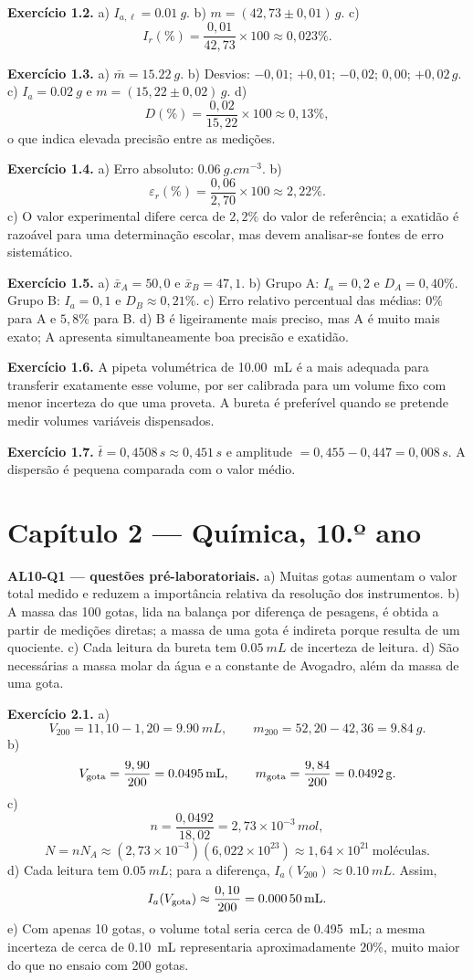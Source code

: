 \documentclass[11pt,a4paper,openany]{book}
\begin{document}
\medskip
\textbf{Exercício 1.2.} a) $I_{a,\ell}=\SI{0.01}{g}$. b) $m=(42,73\pm0,01)\,\si{g}$. c)
\[
I_r(\%)=\frac{0,01}{42,73}\times100\approx0,023\%.
\]

\medskip
\textbf{Exercício 1.3.} a) $\bar m=\SI{15.22}{g}$. b) Desvios: $-0,01$; $+0,01$; $-0,02$; $0,00$; $+0,02\,\si{g}$. c) $I_a=\SI{0.02}{g}$ e $m=(15,22\pm0,02)\,\si{g}$. d)
\[
D(\%)=\frac{0,02}{15,22}\times100\approx0,13\%,
\]
o que indica elevada precisão entre as medições.

\medskip
\textbf{Exercício 1.4.} a) Erro absoluto: $\SI{0.06}{g.cm^{-3}}$. b)
\[
\varepsilon_r(\%)=\frac{0,06}{2,70}\times100\approx2,22\%.
\]
c) O valor experimental difere cerca de $2,2\%$ do valor de referência; a exatidão é razoável para uma determinação escolar, mas devem analisar-se fontes de erro sistemático.

\medskip
\textbf{Exercício 1.5.} a) $\bar x_A=50,0$ e $\bar x_B=47,1$. b) Grupo A: $I_a=0,2$ e $D_A=0,40\%$. Grupo B: $I_a=0,1$ e $D_B\approx0,21\%$. c) Erro relativo percentual das médias: $0\%$ para A e $5,8\%$ para B. d) B é ligeiramente mais preciso, mas A é muito mais exato; A apresenta simultaneamente boa precisão e exatidão.

\medskip
\textbf{Exercício 1.6.} A pipeta volumétrica de \SI{10.00}{mL} é a mais adequada para transferir exatamente esse volume, por ser calibrada para um volume fixo com menor incerteza do que uma proveta. A bureta é preferível quando se pretende medir volumes variáveis dispensados.

\medskip
\textbf{Exercício 1.7.} $\bar t=0,4508\,\si{s}\approx0,451\,\si{s}$ e amplitude $=0,455-0,447=0,008\,\si{s}$. A dispersão é pequena comparada com o valor médio.

\section*{Capítulo 2 — Química, 10.º ano}

\textbf{AL10-Q1 — questões pré-laboratoriais.} a) Muitas gotas aumentam o valor total medido e reduzem a importância relativa da resolução dos instrumentos. b) A massa das 100 gotas, lida na balança por diferença de pesagens, é obtida a partir de medições diretas; a massa de uma gota é indireta porque resulta de um quociente. c) Cada leitura da bureta tem $\SI{0.05}{mL}$ de incerteza de leitura. d) São necessárias a massa molar da água e a constante de Avogadro, além da massa de uma gota.

\medskip
\textbf{Exercício 2.1.} a)
\[
V_{200}=11,10-1,20=\SI{9.90}{mL},\qquad
m_{200}=52,20-42,36=\SI{9.84}{g}.
\]
b)
\[
V_{\rm gota}=\frac{9,90}{200}=\SI{0.0495}{mL},\qquad
m_{\rm gota}=\frac{9,84}{200}=\SI{0.0492}{g}.
\]
c)
\[
n=\frac{0,0492}{18,02}=2,73\times10^{-3}\,\si{mol},
\]
\[
N=nN_A\approx(2,73\times10^{-3})(6,022\times10^{23})
\approx1,64\times10^{21}\ \text{moléculas}.
\]
d) Cada leitura tem $\SI{0.05}{mL}$; para a diferença, $I_a(V_{200})\approx\SI{0.10}{mL}$. Assim,
\[
I_a(V_{\rm gota})\approx\frac{0,10}{200}=\SI{0.00050}{mL}.
\]
e) Com apenas 10 gotas, o volume total seria cerca de \SI{0.495}{mL}; a mesma incerteza de cerca de \SI{0.10}{mL} representaria aproximadamente $20\%$, muito maior do que no ensaio com 200 gotas.
\end{document}
